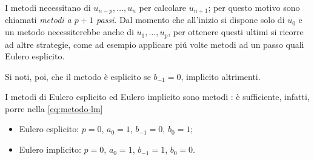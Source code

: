 	\begin{osservazione}
		I metodi  necessitano di \(u_{n - p}, \dots, u_n\) per calcolare \(u_{n + 1}\); per questo motivo sono chiamati \emph{metodi a \(p + 1\) passi}. Dal momento che all'inizio si dispone solo di \(u_0\) e un metodo  necessiterebbe anche di \(u_1, \dots, u_p\), per ottenere questi ultimi si ricorre ad altre strategie, come ad esempio applicare piú volte metodi ad un passo quali Eulero esplicito.
		
		Si noti, poi, che il metodo è esplicito se \(b_{- 1} = 0\), implicito altrimenti.
	\end{osservazione}
	
	\begin{osservazione}
		I metodi di Eulero esplicito ed Eulero implicito sono metodi : è sufficiente, infatti, porre nella \eqref{eq:metodo-lm}
		\begin{itemize}
			\item Eulero esplicito: \(p = 0\), \(a_0 = 1\), \(b_{- 1} = 0\), \(b_0 = 1\);
			\item Eulero implicito: \(p = 0\), \(a_0 = 1\), \(b_{- 1} = 1\), \(b_0 = 0\).
		\end{itemize}
	\end{osservazione}

